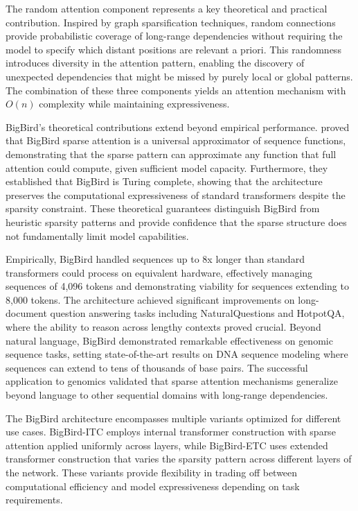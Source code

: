 \documentclass[11pt,letterpaper]{article}
\begin{document}
The random attention component represents a key theoretical and practical contribution. Inspired by graph sparsification techniques, random connections provide probabilistic coverage of long-range dependencies without requiring the model to specify which distant positions are relevant a priori. This randomness introduces diversity in the attention pattern, enabling the discovery of unexpected dependencies that might be missed by purely local or global patterns. The combination of these three components yields an attention mechanism with $O(n)$ complexity while maintaining expressiveness.

BigBird's theoretical contributions extend beyond empirical performance. \cite{zaheer2020bigbird} proved that BigBird sparse attention is a universal approximator of sequence functions, demonstrating that the sparse pattern can approximate any function that full attention could compute, given sufficient model capacity. Furthermore, they established that BigBird is Turing complete, showing that the architecture preserves the computational expressiveness of standard transformers despite the sparsity constraint. These theoretical guarantees distinguish BigBird from heuristic sparsity patterns and provide confidence that the sparse structure does not fundamentally limit model capabilities.

Empirically, BigBird handled sequences up to 8x longer than standard transformers could process on equivalent hardware, effectively managing sequences of 4,096 tokens and demonstrating viability for sequences extending to 8,000 tokens. The architecture achieved significant improvements on long-document question answering tasks including NaturalQuestions and HotpotQA, where the ability to reason across lengthy contexts proved crucial. Beyond natural language, BigBird demonstrated remarkable effectiveness on genomic sequence tasks, setting state-of-the-art results on DNA sequence modeling where sequences can extend to tens of thousands of base pairs. The successful application to genomics validated that sparse attention mechanisms generalize beyond language to other sequential domains with long-range dependencies.

The BigBird architecture encompasses multiple variants optimized for different use cases. BigBird-ITC employs internal transformer construction with sparse attention applied uniformly across layers, while BigBird-ETC uses extended transformer construction that varies the sparsity pattern across different layers of the network. These variants provide flexibility in trading off between computational efficiency and model expressiveness depending on task requirements.
\end{document}
